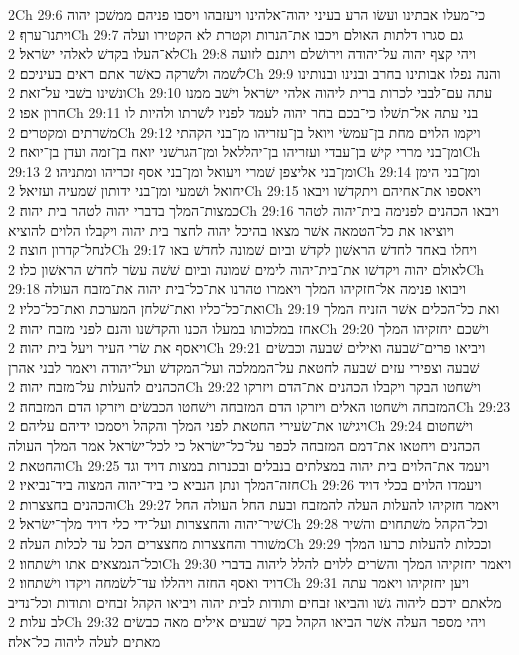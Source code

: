 2Ch 29:6  כי־מעלו אבתינו ועשׂו הרע בעיני יהוה־אלהינו ויעזבהו ויסבו פניהם ממשׁכן יהוה ויתנו־ערף׃
2Ch 29:7  גם סגרו דלתות האולם ויכבו את־הנרות וקטרת לא הקטירו ועלה לא־העלו בקדשׁ לאלהי ישׂראל׃
2Ch 29:8  ויהי קצף יהוה על־יהודה וירושׁלם ויתנם לזועה לשׁמה ולשׁרקה כאשׁר אתם ראים בעיניכם׃
2Ch 29:9  והנה נפלו אבותינו בחרב ובנינו ובנותינו ונשׁינו בשׁבי על־זאת׃
2Ch 29:10  עתה עם־לבבי לכרות ברית ליהוה אלהי ישׂראל וישׁב ממנו חרון אפו׃
2Ch 29:11  בני עתה אל־תשׁלו כי־בכם בחר יהוה לעמד לפניו לשׁרתו ולהיות לו משׁרתים ומקטרים׃
2Ch 29:12  ויקמו הלוים מחת בן־עמשׂי ויואל בן־עזריהו מן־בני הקהתי ומן־בני מררי קישׁ בן־עבדי ועזריהו בן־יהללאל ומן־הגרשׁני יואח בן־זמה ועדן בן־יואח׃
2Ch 29:13  ומן־בני אליצפן שׁמרי ויעואל ומן־בני אסף זכריהו ומתניהו׃
2Ch 29:14  ומן־בני הימן יחואל ושׁמעי ומן־בני ידותון שׁמעיה ועזיאל׃
2Ch 29:15  ויאספו את־אחיהם ויתקדשׁו ויבאו כמצות־המלך בדברי יהוה לטהר בית יהוה׃
2Ch 29:16  ויבאו הכהנים לפנימה בית־יהוה לטהר ויוציאו את כל־הטמאה אשׁר מצאו בהיכל יהוה לחצר בית יהוה ויקבלו הלוים להוציא לנחל־קדרון חוצה׃
2Ch 29:17  ויחלו באחד לחדשׁ הראשׁון לקדשׁ וביום שׁמונה לחדשׁ באו לאולם יהוה ויקדשׁו את־בית־יהוה לימים שׁמונה וביום שׁשׁה עשׂר לחדשׁ הראשׁון כלו׃
2Ch 29:18  ויבואו פנימה אל־חזקיהו המלך ויאמרו טהרנו את־כל־בית יהוה את־מזבח העולה ואת־כל־כליו ואת־שׁלחן המערכת ואת־כל־כליו׃
2Ch 29:19  ואת כל־הכלים אשׁר הזניח המלך אחז במלכותו במעלו הכנו והקדשׁנו והנם לפני מזבח יהוה׃
2Ch 29:20  וישׁכם יחזקיהו המלך ויאסף את שׂרי העיר ויעל בית יהוה׃
2Ch 29:21  ויביאו פרים־שׁבעה ואילים שׁבעה וכבשׂים שׁבעה וצפירי עזים שׁבעה לחטאת על־הממלכה ועל־המקדשׁ ועל־יהודה ויאמר לבני אהרן הכהנים להעלות על־מזבח יהוה׃
2Ch 29:22  וישׁחטו הבקר ויקבלו הכהנים את־הדם ויזרקו המזבחה וישׁחטו האלים ויזרקו הדם המזבחה וישׁחטו הכבשׂים ויזרקו הדם המזבחה׃
2Ch 29:23  ויגישׁו את־שׂעירי החטאת לפני המלך והקהל ויסמכו ידיהם עליהם׃
2Ch 29:24  וישׁחטום הכהנים ויחטאו את־דמם המזבחה לכפר על־כל־ישׂראל כי לכל־ישׂראל אמר המלך העולה והחטאת׃
2Ch 29:25  ויעמד את־הלוים בית יהוה במצלתים בנבלים ובכנרות במצות דויד וגד חזה־המלך ונתן הנביא כי ביד־יהוה המצוה ביד־נביאיו׃
2Ch 29:26  ויעמדו הלוים בכלי דויד והכהנים בחצצרות׃
2Ch 29:27  ויאמר חזקיהו להעלות העלה להמזבח ובעת החל העולה החל שׁיר־יהוה והחצצרות ועל־ידי כלי דויד מלך־ישׂראל׃
2Ch 29:28  וכל־הקהל משׁתחוים והשׁיר משׁורר והחצצרות מחצצרים הכל עד לכלות העלה׃
2Ch 29:29  וככלות להעלות כרעו המלך וכל־הנמצאים אתו וישׁתחוו׃
2Ch 29:30  ויאמר יחזקיהו המלך והשׂרים ללוים להלל ליהוה בדברי דויד ואסף החזה ויהללו עד־לשׂמחה ויקדו וישׁתחוו׃
2Ch 29:31  ויען יחזקיהו ויאמר עתה מלאתם ידכם ליהוה גשׁו והביאו זבחים ותודות לבית יהוה ויביאו הקהל זבחים ותודות וכל־נדיב לב עלות׃
2Ch 29:32  ויהי מספר העלה אשׁר הביאו הקהל בקר שׁבעים אילים מאה כבשׂים מאתים לעלה ליהוה כל־אלה׃
